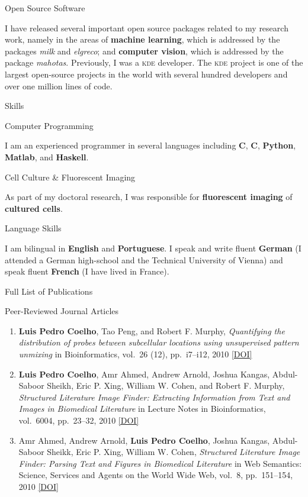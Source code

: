 \documentclass{article}
\renewcommand\section[1]{%
    \par\vspace{2em}\penalty-100%
    {\subhead #1}%
    \par\penalty100\vspace{1em}\penalty100%
}
\renewcommand\subsection[1]{%
    \par\vspace{.1em}%
    {\hspace{1em}\subsubhead #1}%
    \par\vspace{.2em}%
}
\newcommand\cvitem[2][\relax]{%
    \par\vspace{.8em}
    \if\relax#1\else{\Date \textcolor{medg}{#1}}\hspace{1em}\fi%
    {\CvItem #2}%
    \par\vspace{.4em}
}
\newcommand\showdoi[1]{%
    \href{http://dx.doi.org/#1}{[DOI]}%
}
\begin{document}
\cvitem{Open Source Software}
I have released several important open source packages related to my research
work, namely in the areas of \textbf{machine learning}, which is addressed by
the packages \textit{milk} and \textit{elgreco}; and \textbf{computer vision},
which is addressed by the package \textit{mahotas}. Previously, I was a
\textsc{kde} developer. The \textsc{kde} project is one of the largest
open-source projects in the world with several hundred developers and over one
million lines of code.

\section{Skills}

\cvitem{Computer Programming}
I am an experienced programmer in several languages including \textbf{C},
\textbf{C\raisebox{.1em}{\tiny \bf ++}}, \textbf{Python}, \textbf{Matlab}, and
\textbf{Haskell}.

\cvitem{Cell Culture \& Fluorescent Imaging}
As part of my doctoral research, I was responsible for \textbf{fluorescent
imaging} of \textbf{cultured cells}.

\cvitem{Language Skills}
I am bilingual in \textbf{English} and \textbf{Portuguese}. I speak and write
fluent \textbf{German} (I attended a German high-school and the Technical
University of Vienna) and speak fluent \textbf{French} (I have lived in
France).

\bigskip
\pagebreak
\section{Full List of Publications}

\subsection{Peer-Reviewed Journal Articles}
\begin{enumerate}
\item \textbf{Luis Pedro Coelho}, Tao Peng, and Robert F. Murphy,
\emph{Quantifying the distribution of probes between subcellular locations
using unsupervised pattern unmixing} in Bioinformatics, vol.\ 26 (12), pp.\
i7--i12, 2010 \showdoi{10.1093/bioinformatics/btq220}

\item \textbf{Luis Pedro Coelho}, Amr Ahmed, Andrew Arnold, Joshua Kangas,
Abdul-Saboor Sheikh, Eric P. Xing, William W. Cohen, and Robert F. Murphy,
\emph{Structured Literature Image Finder: Extracting Information from Text and
Images in Biomedical Literature} in Lecture Notes in Bioinformatics, vol.\
6004, pp.\ 23--32, 2010 \showdoi{10.1007/978-3-642-13131-8_4}

\item Amr Ahmed, Andrew Arnold, \textbf{Luis Pedro Coelho}, Joshua Kangas,
Abdul-Saboor Sheikk, Eric P. Xing, William W. Cohen, \emph{Structured
Literature Image Finder: Parsing Text and Figures in Biomedical Literature} in
Web Semantics: Science, Services and Agents on the World Wide Web, vol.\ 8,
pp.\ 151--154, 2010 \showdoi{10.1016/j.websem.2010.04.002}

\end{enumerate}
\end{document}
